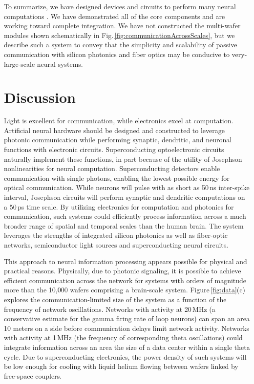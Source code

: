\documentclass[twocolumn]{article}
\begin{document}
To summarize, we have designed devices and circuits to perform many neural computations \cite{sh2018,sh2018_full}. We have demonstrated all of the core components and are working toward complete integration. We have not constructed the multi-wafer modules shown schematically in Fig.\,\ref{fig:communicationAcrossScales}, but we describe such a system to convey that the simplicity and scalability of passive communication with silicon photonics and fiber optics may be conducive to very-large-scale neural systems. 

\section{\label{sec:discussion}Discussion}
Light is excellent for communication, while electronics excel at computation. Artificial neural hardware should be designed and constructed to leverage photonic communication while performing synaptic, dendritic, and neuronal functions with electronic circuits. Superconducting optoelectronic circuits naturally implement these functions, in part because of the utility of Josephson nonlinearities for neural computation. Superconducting detectors enable communication with single photons, enabling the lowest possible energy for optical communication. While neurons will pulse with as short as 50\,ns inter-spike interval, Josephson circuits will perform synaptic and dendritic computations on a 50\,ps time scale. By utilizing electronics for computation and photonics for communication, such systems could efficiently process information across a much broader range of spatial and temporal scales than the human brain. The system leverages the strengths of integrated silicon photonics as well as fiber-optic networks, semiconductor light sources and superconducting neural circuits.

This approach to neural information processing appears possible for physical and practical reasons. Physically, due to photonic signaling, it is possible to achieve efficient communication across the network for systems with orders of magnitude more than the 10,000 wafers comprising a brain-scale system. Figure\,\ref{fig:data}(c) explores the communication-limited size of the system as a function of the frequency of network oscillations. Networks with activity at 20\,MHz (a conservative estimate for the gamma firing rate of loop neurons) can span an area 10 meters on a side before communication delays limit network activity. Networks with activity at 1\,MHz (the frequency of corresponding theta oscillations) could integrate information across an area the size of a data center within a single theta cycle. Due to superconducting electronics, the power density of such systems will be low enough for cooling with liquid helium flowing between wafers linked by free-space couplers. 
\end{document}
